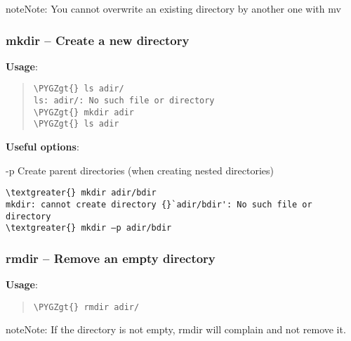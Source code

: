 \documentclass[a4paper,11pt,english]{sphinxmanual}
\def\PYGZgt{\char`\>}
\begin{document}
\begin{notice}{note}{Note:}
You cannot overwrite an existing directory by another one with mv
\end{notice}


\subsubsection{mkdir – Create a new directory}
\label{introduction:mkdir-create-a-new-directory}\label{introduction:mkdir}
\textbf{Usage}:  
\begin{quote}

\begin{Verbatim}[frame=single, rulecolor=\color{lightgray}, fontfamily=courier, commandchars=\\\{\}]
\PYGZgt{} ls adir/
ls: adir/: No such file or directory
\PYGZgt{} mkdir adir
\PYGZgt{} ls adir
\end{Verbatim}
\end{quote}

\textbf{Useful options}:
\begin{optionlist}{3cm}
\item [-p]  
Create parent directories (when creating nested directories)
\end{optionlist}

\begin{Verbatim}[frame=single, rulecolor=\color{lightgray}, fontfamily=courier, commandchars=\\\{\}]
\textgreater{} mkdir adir/bdir
mkdir: cannot create directory {}`adir/bdir': No such file or directory
\textgreater{} mkdir –p adir/bdir
\end{Verbatim}


\subsubsection{rmdir – Remove an empty directory}
\label{introduction:rmdir-remove-an-empty-directory}
\textbf{Usage}:  
\begin{quote}

\begin{Verbatim}[frame=single, rulecolor=\color{lightgray}, fontfamily=courier, commandchars=\\\{\}]
\PYGZgt{} rmdir adir/
\end{Verbatim}
\end{quote}

\begin{notice}{note}{Note:}
If the directory is not empty, rmdir will complain and not remove it.
\end{notice}
\end{document}
